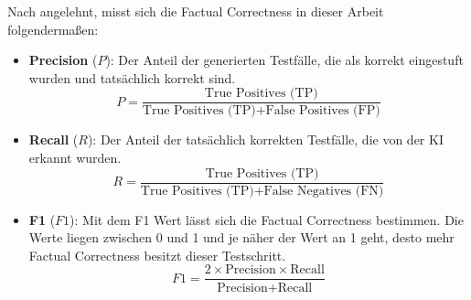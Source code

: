 \documentclass[12pt,toc=bib,toc=listof]{scrreprt}
\begin{document}
\noindent Nach \textcite{Ragas2025} angelehnt, misst sich die Factual Correctness in dieser Arbeit folgendermaßen:
\begin{itemize}
    \item \textbf{Precision} (\(P\)): Der Anteil der generierten Testfälle, die als korrekt eingestuft wurden und tatsächlich korrekt sind.
    \begin{equation*}
    P = \frac{\text{True Positives (TP)}}{\text{True Positives (TP)} + \text{False Positives (FP)}}
    \end{equation*}
    \item \textbf{Recall} (\(R\)): Der Anteil der tatsächlich korrekten Testfälle, die von der KI erkannt wurden.
    \begin{equation*}
    R = \frac{\text{True Positives (TP)}}{\text{True Positives (TP)} + \text{False Negatives (FN)}}
    \end{equation*}
    \item \textbf{F1} (\(F1\)): Mit dem F1 Wert lässt sich die Factual Correctness bestimmen. Die Werte liegen zwischen 0 und 1 und je näher der Wert an 1 geht, desto mehr Factual Correctness besitzt dieser Testschritt.
    \begin{equation*}
    F1 = \frac {2 \times \text{Precision} \times \text{Recall}}{\text{Precision} + \text{Recall}}
\end{equation*}
\end{itemize}
\end{document}
